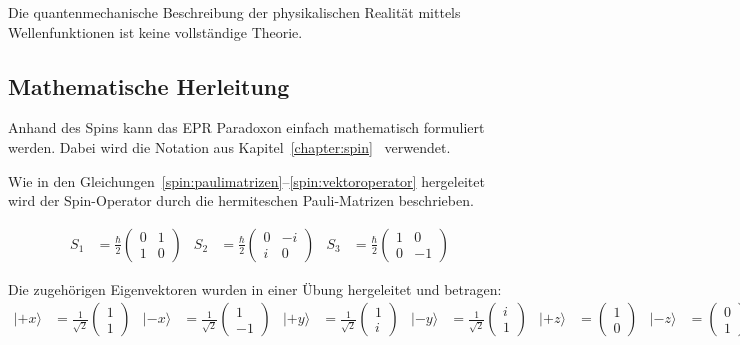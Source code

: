 \begin{refsection}
\begin{satz}
    Die quantenmechanische Beschreibung der physikalischen Realit\"at mittels
    Wellenfunktionen ist keine vollst\"andige Theorie.
\end{satz}

\subsection{Mathematische Herleitung}
Anhand des Spins kann das EPR Paradoxon einfach mathematisch formuliert werden.
Dabei wird die Notation aus Kapitel~\ref{chapter:spin}~
verwendet.

Wie in den Gleichungen~\ref{spin:paulimatrizen}--\ref{spin:vektoroperator}
hergeleitet wird der Spin-Operator durch die hermiteschen Pauli-Matrizen
beschrieben.

\begin{align*}
    S_1 &= \frac{\hbar}{2} \begin{pmatrix}
    0 & 1 \\ 1 & 0
    \end{pmatrix}
    &
    S_2 &= \frac{\hbar}{2} \begin{pmatrix}
    0 & -i \\ i & 0
    \end{pmatrix}
    &
    S_3 &= \frac{\hbar}{2} \begin{pmatrix}
    1 & 0 \\ 0 & -1
    \end{pmatrix}
\end{align*}

Die zugeh\"origen Eigenvektoren wurden in einer \"Ubung hergeleitet und
betragen:
\begin{align*}
    |{+}x\rangle &= \frac{1}{\sqrt{2}}\begin{pmatrix} 1\\1 \end{pmatrix} &
    |{-}x\rangle &= \frac{1}{\sqrt{2}}\begin{pmatrix} 1\\-1 \end{pmatrix} &
    |{+}y\rangle &= \frac{1}{\sqrt{2}}\begin{pmatrix} 1\\i \end{pmatrix} &
    |{-}y\rangle &= \frac{1}{\sqrt{2}}\begin{pmatrix} i\\1 \end{pmatrix} &
    |{+}z\rangle &= \begin{pmatrix} 1\\0 \end{pmatrix} &
    |{-}z\rangle &= \begin{pmatrix} 0\\1 \end{pmatrix} &
\end{align*}


\end{refsection}
